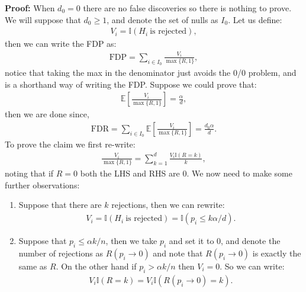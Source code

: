\documentclass[twoside,12pt]{article}
\begin{document}
{\bf Proof: } When $d_0 = 0$ there are no false discoveries so there is nothing to prove. We will suppose that $d_0 \geq 1$, and denote the set of nulls as $I_0$.
Let us define:
\begin{align*}
V_i = \mathbb{I}(H_i~\text{is rejected}),
\end{align*}
then we can write the FDP as:
\begin{align*}
\text{FDP} = \sum_{i \in I_0} \frac{V_i}{\max\{R,1\}},
\end{align*}
notice that taking the max in the denominator just avoids the 0/0 problem, and is a shorthand way of writing the FDP. Suppose we could prove that:
\begin{align*}
\mathbb{E}\left[ \frac{V_i}{\max\{R,1\}} \right] = \frac{\alpha}{d},
\end{align*}
then we are done since,
\begin{align*}
\text{FDR} = \sum_{i \in I_0} \mathbb{E}\left[\frac{V_i}{\max\{R,1\}}\right] =  \frac{d_0 \alpha}{d}.
\end{align*}
To prove the claim we first re-write:
\begin{align*}
\frac{V_i}{\max\{R,1\}} = \sum_{k=1}^d \frac{V_i \mathbb{I}(R = k)}{k},
\end{align*}
noting that if $R = 0$ both the LHS and RHS are 0. We now need to make some further observations:
\begin{enumerate}
\item Suppose that there are $k$ rejections, then we can rewrite:
\begin{align*}
V_i =  \mathbb{I}(H_i~\text{is rejected}) = \mathbb{I}(p_i \leq k\alpha/d).
\end{align*}
\item Suppose that $p_i \leq \alpha k /n$, then we take $p_i$ and set it to 0, and denote the number of rejections as $R(p_i \rightarrow 0)$ and note that $R(p_i \rightarrow 0)$ is exactly the same as $R$. On the other hand if $p_i > \alpha k /n$ then $V_i = 0$. So we can write:
\begin{align*}
V_i \mathbb{I}(R = k) = V_i \mathbb{I}(R(p_i \rightarrow 0) = k).
\end{align*}
\end{enumerate}
\end{document}
